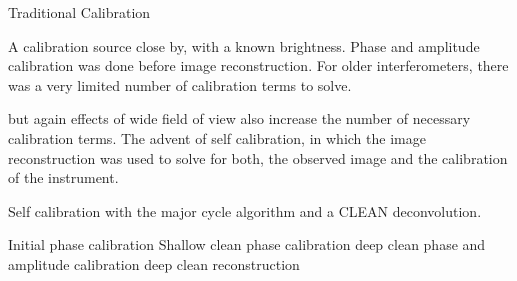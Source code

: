 Traditional Calibration

A calibration source close by, with a known brightness. Phase and amplitude calibration was done before image reconstruction. For older interferometers, there was a very limited number of calibration terms to solve.


but again effects of wide field of view also increase the number of necessary calibration terms. The advent of self calibration, in which the image reconstruction was used to solve for both, the observed image and the calibration of the instrument.

Self calibration with the major cycle algorithm and a CLEAN deconvolution.

Initial phase calibration
Shallow clean
phase calibration
deep clean
phase and amplitude calibration
deep clean
reconstruction






